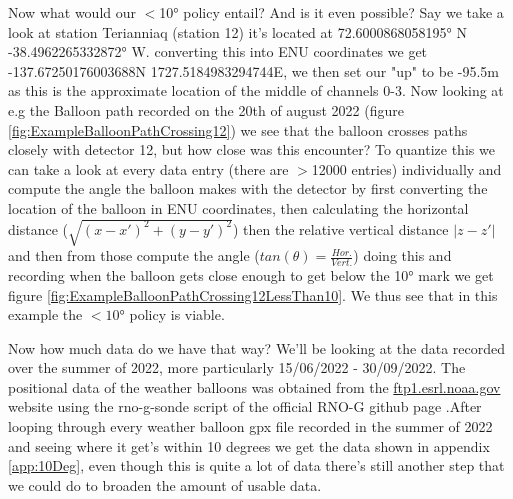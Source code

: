 \documentclass[11pt,a4paper,faculty=we,language=en,doctype=report]{cls/ugent-doc}
\begin{document}
Now what would our $<$10° policy entail? And is it even possible? 
Say we take a look at station Terianniaq (station 12)
it's located at 72.6000868058195° N -38.4962265332872° W.
converting this into ENU coordinates we get -137.67250176003688N
1727.5184983294744E, we then set our "up" to be -95.5m as this is the
approximate location of the middle of channels 0-3.  Now looking at e.g the
Balloon path recorded on the 20th of august 2022 (figure
\ref{fig:ExampleBalloonPathCrossing12}) we see that the balloon crosses paths
closely with detector 12, but how close was this encounter? To quantize this we can take a look at every data
entry (there are $>$12000 entries) individually and compute the angle the
balloon makes with the detector by first converting the location of the balloon
in ENU coordinates, then calculating the horizontal distance ($\sqrt{(x-x')^2 +
(y-y')^2}$) then the relative vertical distance $|z - z'|$ and then from those
compute the angle ($tan(\theta) = \frac{Hor.}{Vert.}$) doing this and recording
when the balloon gets close enough to get below the 10° mark we get figure
\ref{fig:ExampleBalloonPathCrossing12LessThan10}. We thus see that in this
example the $<10$° policy is viable.

Now how much data do we have that way? 
We'll be looking at the data recorded over the summer of
2022, more particularly 15/06/2022 - 30/09/2022.
The positional data of the weather balloons was obtained from the
\url{ftp1.esrl.noaa.gov} website using the rno-g-sonde script of the official
RNO-G github page .After looping through every weather
balloon gpx file recorded in the summer of 2022 and seeing where it get's
within 10 degrees we get the data shown in appendix \ref{app:10Deg}, even
though this is quite a lot of data there's still another step that we could do
to broaden the amount of usable data.
\end{document}
